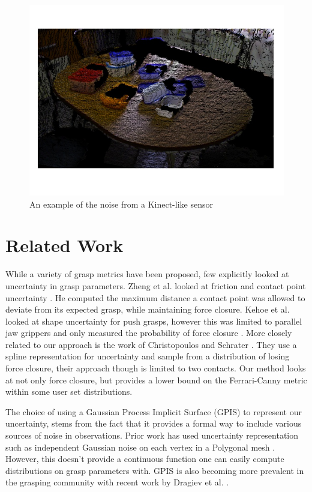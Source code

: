 \documentclass[letterpaper, 10 pt, conference]{ieeeconf}  %
\begin{document}
\begin{figure}[ht!]
\centering
\includegraphics[scale = 0.3]{figures/Slide2.jpg}
\caption{An example of the noise from a Kinect-like sensor}
\vspace*{-10pt}
\label{fig:noisy data}
\end{figure}


\section{Related Work}

While a variety of grasp metrics have been proposed, few explicitly looked at uncertainty in grasp parameters. Zheng et al. looked at friction and contact point uncertainty \cite{zheng2005}. He computed the maximum distance a contact point was allowed to deviate from its expected grasp, while maintaining force closure. Kehoe et al. looked at shape uncertainty for push grasps, however this was limited to parallel jaw grippers and only measured the probability of force closure \cite{kehoe2012toward}. More closely related to our approach is the work of Christopoulos and Schrater \cite{christopoulos2007handling}. They use a spline representation for uncertainty and sample from a distribution of losing force closure, their approach though is limited to two contacts. Our method looks at not only force closure, but provides a lower bound on the Ferrari-Canny metric within some user set distributions.  

The choice of using a Gaussian Process Implicit Surface (GPIS) to represent our uncertainty, stems from the fact that it provides a formal way to include various sources of noise in observations. Prior work has used uncertainty representation such as independent Gaussian noise on each vertex in a Polygonal mesh \cite{kehoe2012toward}. However, this doesn't provide a continuous function one can easily compute distributions on grasp parameters with. GPIS is also becoming more prevalent in the grasping community with recent work by Dragiev et al. \cite{dragiev2011} . 
\end{document}
